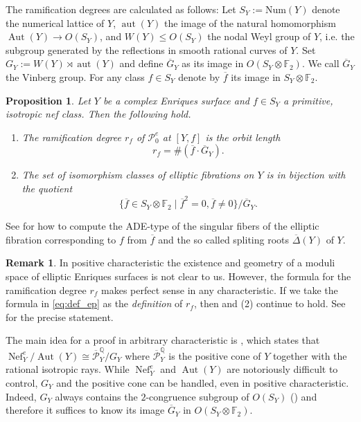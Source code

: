 \documentclass{amsart}
\theoremstyle{definition}
\newtheorem{remark}[definition]{Remark}
\theoremstyle{plain}
\newtheorem{proposition}[definition]{Proposition}
\DeclareMathOperator{\Nef}{Nef}
\DeclareMathOperator{\Aut}{Aut}
\DeclareMathOperator{\aut}{aut}
\newcommand{\FF}{\mathbb{F}}
\renewcommand{\P}{\mathcal{P}}
\newcommand{\Num}{\textrm{Num}}
\newcommand{\Gbar}{\overline{G}}
\newcommand{\Pbar}{\overline{\P}^\mathbb{Q}}
\begin{document}
The ramification degrees are calculated as follows:
Let $S_Y:=\Num(Y)$ denote the numerical lattice of $Y$, $\aut(Y)$ the image of the natural homomorphism $\Aut(Y) \to O(S_Y)$, and $W(Y)\leq O(S_Y)$ the nodal Weyl group of $Y$, i.e. the subgroup generated by the reflections in smooth rational curves of $Y$.
Set $G_Y := W(Y) \rtimes \aut(Y)$ and define $\Gbar_Y$ as its image in $O(S_Y \otimes \FF_2)$. We call $\Gbar_Y$ the Vinberg group.
For any class $f \in S_Y$ denote by $\overline{f}$ its image in $S_Y \otimes \FF_2$.
\begin{proposition}\label{prop:intro} Let $Y$ be a complex Enriques surface and $f\in S_Y$ a primitive, isotropic nef class. Then the following hold.
\begin{enumerate}
\item[(a)]  The ramification degree $r_f$ of $\P^e_0$ at $[Y,f]$ is the orbit length
\begin{equation}\label{eq:def_ep}
    r_f=\#\left(\overline f\cdot \Gbar_Y \right).
\end{equation}
\item[(b)] The set of isomorphism classes of elliptic fibrations on $Y$ is in bijection with the quotient
\begin{equation} \label{eq:isom_ell_fibr_as_quotient}
    \{\overline{f} \in S_Y\otimes \FF_2 \mid \overline{f}^2=0, \overline{f}\neq 0\}/\Gbar_Y.
\end{equation}
\end{enumerate}
\end{proposition}
See  for how to compute the ADE-type of the singular fibers of the elliptic fibration corresponding to $f$ from $\overline{f}$ and the so called spliting roots $\overline{\Delta}(Y)$ of $Y$.
\begin{remark}
In positive characteristic the existence and geometry of a moduli space of elliptic Enriques surfaces is not clear to us. However, the formula for the ramification degree $r_f$ makes perfect sense in any characteristic. If we take the formula in \cref{eq:def_ep} as the \emph{definition} of $r_f$, then  and  (2) continue to hold. See  for the precise statement.
\end{remark}
The main idea for a proof in arbitrary characteristic is
, which states that
$\Nef^e_Y/\Aut(Y) \cong \Pbar_Y/G_Y$ where $\Pbar_Y$ is the positive cone of $Y$ together with the rational isotropic rays. While $\Nef^e_Y$ and $\Aut(Y)$ are notoriously difficult to control, $G_Y$ and the positive cone can be handled, even in positive characteristic.
Indeed, $G_Y$ always contains the $2$-congruence subgroup of $O(S_Y)$ () and therefore it suffices to know its image $\Gbar_Y$ in $O(S_Y \otimes \FF_2)$.
\end{document}
